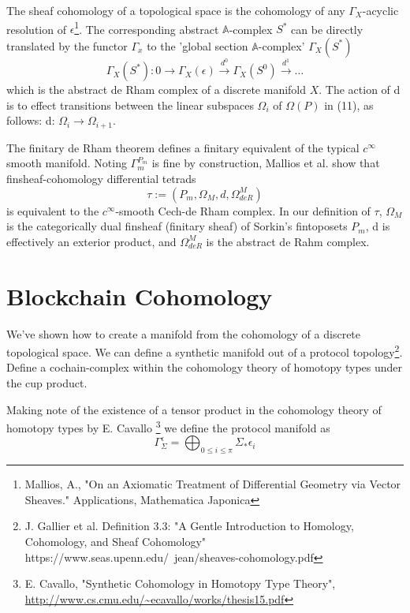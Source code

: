 \documentclass{article}
\begin{document}
The sheaf cohomology of a topological space is the cohomology of any $\Gamma_X$-acyclic resolution of $\epsilon$\footnote{Mallios, A., "On an Axiomatic Treatment of Differential Geometry via Vector
Sheaves." Applications, Mathematica Japonica }. The corresponding abstract $\mathbb{A}$-complex $S^*$ can be directly translated by the functor $\Gamma_x$ to the 'global section $\mathbb{A}$-complex' $\Gamma_X(S^*)$
\begin{equation} \label{eq1}
\Gamma_X(S^*):  0 \xrightarrow{~} \Gamma_X(\epsilon) \xrightarrow{d^0} \Gamma_X(S^0) \xrightarrow{d^1} \dots
\end{equation} \label{eq1}
which is the abstract de Rham complex of a discrete manifold $X$. The action of d is to effect transitions between the linear subspaces $\Omega_i$ of $\Omega(P)$ in (11), as follows: d: $\Omega_i \rightarrow \Omega_{i+1}$.

The finitary de Rham theorem defines a finitary equivalent of the typical $c^{\infty}$ smooth manifold. Noting $\Gamma^{P_m}_m$ is fine by construction, Mallios et al. show that finsheaf-cohomology differential tetrads
\begin{equation} \label{eq1}
\tau := (P_m, \Omega_M, d, \Omega^M_{deR})
\end{equation} \label{eq1}
is equivalent to the $c^{\infty}$-smooth Cech-de Rham complex. In our definition of $\tau$, $\Omega_M$ is the categorically dual finsheaf (finitary sheaf) of Sorkin's  fintoposets $P_m$, d is effectively an exterior product, and $ \Omega^M_{deR}$ is the abstract de Rahm complex.

\section{Blockchain Cohomology}
We've shown how to create a manifold from the cohomology of a discrete topological space.  We can define a synthetic manifold out of a protocol topology\footnote{J. Gallier et al. Definition 3.3: "A Gentle Introduction to Homology, Cohomology, and
Sheaf Cohomology" https://www.seas.upenn.edu/~jean/sheaves-cohomology.pdf}. Define a cochain-complex within the cohomology theory of homotopy types under the cup product.

Making note of the existence of a tensor product in the cohomology theory of homotopy types by E. Cavallo \footnote{E. Cavallo, "Synthetic Cohomology in Homotopy Type Theory", \url{http://www.cs.cmu.edu/~ecavallo/works/thesis15.pdf}} we define the protocol manifold as 
\begin{equation} \label{eq1}
\Gamma^\epsilon_{\Sigma} = \bigoplus_{0 \leq i \leq \pi} \Sigma_* \epsilon_i
\end{equation} \label{eq1}
\end{document}
